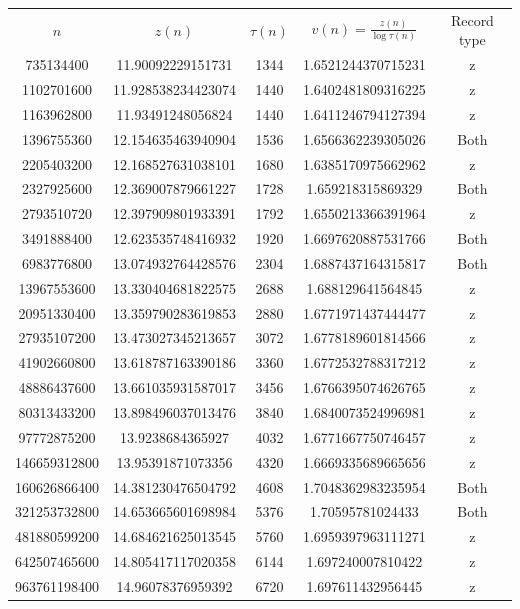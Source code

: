\documentclass{article}
\begin{document}
    \begin{center}
\begin{tabular}{ |c|c|c|c|c| } 
 \hline
$n$ & $z(n)$ & $\tau(n)$  & $v(n)=\frac{z(n)}{\log \tau(n)}$ & Record type  \\ 
735134400  & 11.90092229151731   &  1344 & 1.6521244370715231 & z\\
1102701600 & 11.928538234423074	& 1440   & 1.6402481809316225 &z\\	
1163962800 & 11.93491248056824  &	1440 & 1.6411246794127394	&z\\
1396755360 & 12.154635463940904	& 1536   & 1.6566362239305026 & Both\\
2205403200 & 12.168527631038101 & 1680   &  1.6385170975662962	& z\\
2327925600 & 12.369007879661227	&1728   & 1.659218315869329 &Both\\
2793510720 & 12.397909801933391	& 1792  & 1.6550213366391964	& z\\
3491888400 & 12.623535748416932	& 1920  &	 1.6697620887531766	& Both \\
6983776800 &	13.074932764428576	& 2304	& 1.6887437164315817 & Both\\
13967553600	&  13.330404681822575	&2688	& 1.688129641564845	& z\\
20951330400	& 13.359790283619853	& 2880	& 1.6771971437444477 & z\\
27935107200	&  13.473027345213657	& 3072 & 1.6778189601814566& z \\
41902660800	&  13.618787163390186	&  3360	& 1.6772532788317212 & z \\
48886437600	& 13.661035931587017 &  3456 & 1.6766395074626765 & z\\
80313433200	&	13.898496037013476	& 3840	& 1.6840073524996981 &z\\
97772875200	& 13.9238684365927 & 4032 & 1.6771667750746457 & z \\
146659312800 &	13.95391871073356 & 4320 &	1.6669335689665656 & z\\
160626866400 &	14.381230476504792 &  4608	& 1.7048362983235954 & Both\\
321253732800 &	14.653665601698984 &	 5376 & 1.70595781024433 & Both\\
481880599200 & 14.684621625013545 & 5760 &1.6959397963111271 & z\\
642507465600 &  14.805417117020358 &  6144 & 1.697240007810422 & z\\	
963761198400 & 14.96078376959392 &  6720 & 1.697611432956445 & z\\

\end{tabular}
\end{center}
\end{document}
